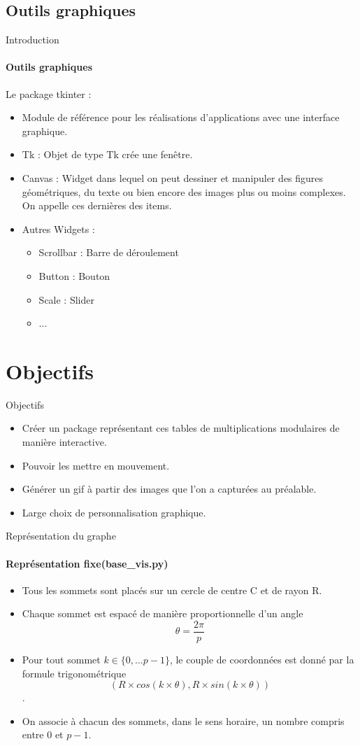\documentclass{beamer}
\begin{document}
\subsection{Outils graphiques}
\begin{frame}{Introduction}

\framesubtitle{Outils graphiques}
Le package tkinter :
\begin{itemize}
\item Module de référence pour les réalisations d'applications avec une interface graphique.
\item Tk : Objet de type Tk crée une fenêtre.
\item Canvas : Widget dans lequel on peut dessiner et manipuler des figures géométriques, du texte ou bien encore des images plus ou moins complexes. On appelle ces dernières des items.
\item Autres Widgets : 
\begin{itemize}
\item Scrollbar : Barre de déroulement
\item Button : Bouton
\item Scale : Slider 
\item ...
\end{itemize}
\end{itemize}
\end{frame}

\section{Objectifs}
\begin{frame}{Objectifs}
\begin{itemize}
\item Créer un package représentant ces tables de multiplications modulaires de manière interactive.
\item Pouvoir les mettre en mouvement. 
\item Générer un gif à partir des images que l'on a capturées au préalable.
\item Large choix de personnalisation graphique.
\end{itemize}
\end{frame}

\begin{frame}{Représentation du graphe}
\framesubtitle{Représentation fixe(base\_vis.py)}
\begin{itemize}
\item Tous les sommets sont placés sur un cercle de centre C et de rayon R.
\item Chaque sommet est espacé de manière proportionnelle d'un angle $$\theta=\frac{2\pi}{p}$$
\item Pour tout sommet $k \in \{0,...p-1\} $, le couple de coordonnées est donné par la formule trigonométrique $$(R\times cos(k\times \theta),R\times sin(k\times \theta))$$.
\item On associe à chacun des sommets, dans le sens horaire, un nombre compris entre 0 et $p-1$. 
\end{itemize} 
\end{frame}
\end{document}
